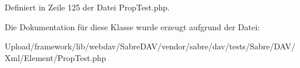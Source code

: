 Definiert in Zeile 125 der Datei Prop\+Test.\+php.



Die Dokumentation für diese Klasse wurde erzeugt aufgrund der Datei\+:\begin{DoxyCompactItemize}
\item 
Upload/framework/lib/webdav/\+Sabre\+D\+A\+V/vendor/sabre/dav/tests/\+Sabre/\+D\+A\+V/\+Xml/\+Element/Prop\+Test.\+php\end{DoxyCompactItemize}
